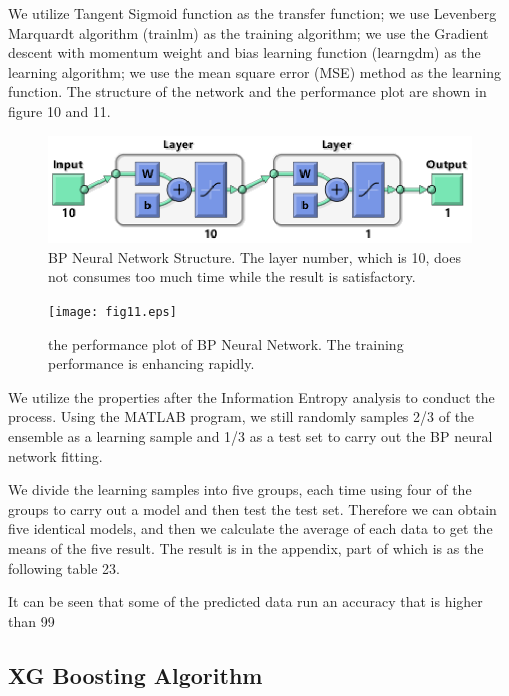 We utilize Tangent Sigmoid function as the transfer function; we use Levenberg Marquardt algorithm (trainlm) as the training algorithm; we use the Gradient descent with momentum weight and bias learning function (learngdm) as the learning algorithm; we use the mean square error (MSE) method as the learning function. The structure of the network and the performance plot are shown in figure 10 and 11. 

\begin{figure}[!ht]
	\centering
	\includegraphics[width=360pt]{fig10.eps}
	\caption{BP Neural Network Structure. The layer number, which is 10, does not consumes too much time while the result is satisfactory. }
	\label{fig10}
\end{figure}

\begin{figure}[!ht]
	\centering
	\texttt{[image: fig11.eps]}
	\caption{ the performance plot of BP Neural Network. The training performance is enhancing rapidly.  }
	\label{fig11}
\end{figure}

We utilize the properties after the Information Entropy analysis to conduct the process. Using the MATLAB program, we still randomly samples 2/3 of the ensemble as a learning sample and 1/3 as a test set to carry out the BP neural network fitting.

We divide the learning samples into five groups, each time using four of the groups to carry out a model and then test the test set. Therefore we can obtain five identical models, and then we calculate the average of each data to get the means of the five result. The result is in the appendix, part of which is as the following table 23. 

It can be seen that some of the predicted data run an accuracy that is higher than 99%

\subsection{XG Boosting Algorithm}

